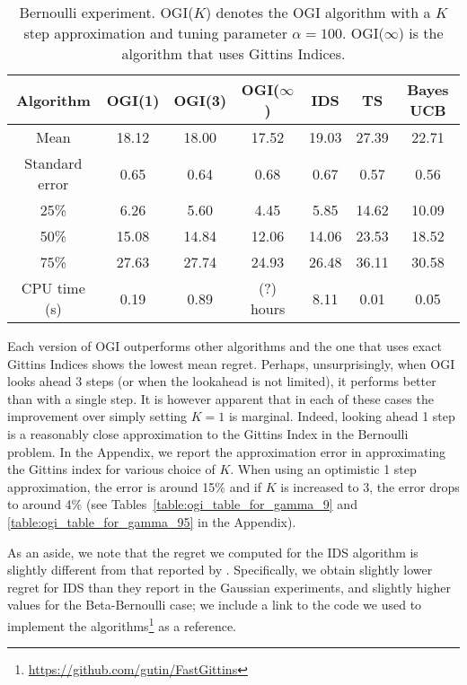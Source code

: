 \begin{table}[h!]
	\centering
	\begin{tabular}{ccccccc} \toprule
		\textbf{Algorithm} & \textbf{OGI(1)} & \textbf{OGI(3)} &  \textbf{OGI($\infty$)} & \textbf{IDS} & \textbf{TS} & \textbf{Bayes UCB}  \\ \midrule
		Mean &  18.12 & 18.00 & 17.52 & 19.03 & 27.39 & 22.71 \\ 
		Standard error & 0.65 & 0.64 &  0.68 & 0.67 & 0.57 & 0.56 \\ 
		25\% & 6.26 & 5.60 & 4.45 & 5.85 & 14.62 & 10.09 \\
		50\% & 15.08 & 14.84 &12.06 & 14.06 & 23.53 & 18.52 \\
		75\% & 27.63 & 27.74 & 24.93 & 26.48 & 36.11 & 30.58 \\
		CPU time (s) & 0.19 & 0.89 & (?) hours & 8.11 & 0.01 & 0.05  \\ \bottomrule
	\end{tabular}
	\caption[Table caption text]{Bernoulli experiment. OGI($K$) denotes the OGI algorithm with a $K$ step approximation and tuning parameter $\alpha = 100$. OGI($\infty$) is the algorithm that uses Gittins Indices.}
	\label{table:bernoulli_experiment1}
\end{table}
Each version of OGI outperforms other algorithms and the one that uses exact Gittins Indices shows the lowest mean regret.
Perhaps, unsurprisingly, when OGI  looks ahead 3 steps (or when the lookahead is not limited), it performs better than with a single step. It is however apparent that in each of these cases the improvement over simply setting $K=1$ is marginal. Indeed, looking ahead 1 step is a reasonably close approximation to the Gittins Index in the Bernoulli problem. In the Appendix, we report the approximation error in approximating the Gittins index for various choice of $K$. When using an optimistic 1 step approximation, the error is around 15\% and if $K$ is increased to 3, the error drops to around 4\% (see Tables~\ref{table:ogi_table_for_gamma_9} and \ref{table:ogi_table_for_gamma_95} in the Appendix). 

As an aside, we note that the regret we computed for the IDS algorithm is slightly different from that reported by \cite{russo2014learning}. Specifically, we obtain slightly lower regret for IDS than they report in the Gaussian experiments, and slightly higher values for the Beta-Bernoulli case; we include a link to the code we used to implement the algorithms\footnote{\url{https://github.com/gutin/FastGittins}} as a reference.  

